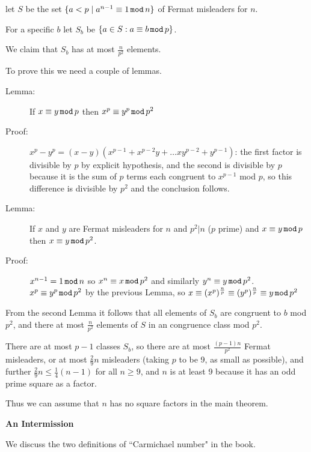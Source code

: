 \documentclass[12pt]{article}
\begin{document}
  let $S$ be the set $\{a < p \mid a^{n-1} \equiv 1\, {\tt mod}\, n\}$ of Fermat misleaders for $n$.

For a specific $b$ let $S_b$ be $\{a \in S:a \equiv b\,{\tt mod}\, p\}$.

We claim that $S_b$ has at most $\frac n{p^2}$ elements.

To prove this we need a couple of lemmas.

\begin{description}

\item [Lemma:]  If $x \equiv y\, {\tt mod}\,p$ then $x^p\equiv y^p\,{\tt mod}\,p^2$

\item[Proof:]  $x^p-y^p=(x-y)(x^{p-1}+x^{p-2}y+\ldots xy^{p-2}+y^{p-1})$:  the first factor is divisible by $p$ by explicit hypothesis, and the second is divisible by $p$ because it is the sum of $p$
terms each congruent to $x^{p-1}$ mod $p$, so this difference is divisible by $p^2$ and the conclusion follows.

\item[Lemma:]  If $x$ and $y$ are Fermat misleaders for $n$ and $p^2 | n$ ($p$ prime) and $x \equiv y \,{\tt mod} \,p$ then $x \equiv y\, {\tt mod} \,p^2$.

\item[Proof:]  $x^{n-1}=1\,{\tt mod} \,n$ so $x^n\equiv x\,{\tt mod}\,p^2$ and similarly $y^n\equiv y\,{\tt mod}\,p^2$.  $x^p \equiv  y^p\,{\tt mod}\, p^2$ by the previous Lemma, so $x \equiv (x^p)^{\frac np} \equiv (y^p)^{\frac np} \equiv y \,{\tt mod}\,p^2$

\end{description}

From the second Lemma it follows that all elements of $S_b$ are congruent to $b$ mod $p^2$, and there at most  $\frac n{p^2}$ elements of $S$ in an congruence class mod $p^2$.

There are at most $p-1$ classes $S_b$, so there are at most $\frac{(p-1)n}{p^2}$ Fermat misleaders,
or at most $\frac29n$ misleaders (taking $p$ to be 9, as small as possible), and further $\frac 29n \leq \frac14(n-1)$ for
all $n \geq 9$, and $n$ is at least 9 because it has an odd prime square as a factor.

Thus we can assume that $n$ has no square factors in the main theorem.

{\bf An Intermission}

We discuss the two definitions of ``Carmichael number" in the book.
\end{document}
